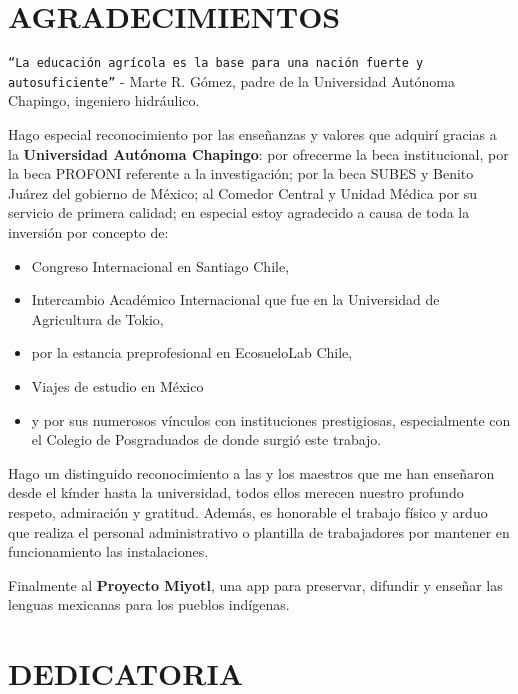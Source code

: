 

\chapter*{AGRADECIMIENTOS}
\begin{center}
    \texttt{``La educación agrícola es la base para una nación fuerte y autosuficiente''} - Marte R. Gómez, padre de la Universidad Autónoma Chapingo, ingeniero hidráulico.
\end{center}

Hago especial reconocimiento por las enseñanzas y valores que adquirí gracias a la \textbf{Universidad Autónoma Chapingo}: por ofrecerme la beca institucional, por la beca PROFONI referente a la investigación; por la beca SUBES y Benito Juárez del gobierno de México; al Comedor Central y Unidad Médica por su servicio de primera calidad; en especial estoy agradecido a causa de toda la inversión por concepto de:
\begin{itemize}
    \item Congreso Internacional en Santiago Chile, 
    \item Intercambio Académico Internacional que fue en la Universidad de Agricultura de Tokio, 
    \item por la estancia preprofesional en EcosueloLab Chile, 
    \item Viajes de estudio en México
    \item y por sus numerosos vínculos con instituciones prestigiosas, especialmente con el Colegio de Posgraduados de donde surgió este trabajo.
\end{itemize}

Hago un distinguido reconocimiento a las y los maestros que me han enseñaron desde el kínder hasta la universidad, todos ellos merecen nuestro profundo respeto, admiración y gratitud. Además, es honorable el trabajo físico y arduo que realiza el personal administrativo o plantilla de trabajadores por mantener en funcionamiento las instalaciones.

Finalmente al \textbf{Proyecto Miyotl}, una app para preservar, difundir y enseñar las lenguas mexicanas para los pueblos indígenas.
\newpage

\chapter*{DEDICATORIA}

